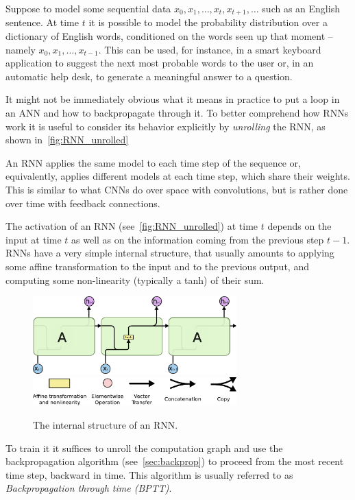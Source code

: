 Suppose to model some sequential data $x_0, x_1, \dots , x_t, x_{t+1}, \dots$
such as an English sentence. At time $t$ it is possible to model the
probability distribution over a dictionary of English words, conditioned on the
words seen up that moment -- namely $x_0, x_1, \dots , x_{t-1}$. This can be
used, for instance, in a smart keyboard application to suggest the next most
probable words to the user or, in an automatic help desk, to generate a
meaningful answer to a question.

It might not be immediately obvious what it means in practice to put a loop in
an ANN and how to backpropagate through it. To better comprehend how RNNs work
it is useful to consider its behavior explicitly by \emph{unrolling} the RNN,
as shown in~\autoref{fig:RNN_unrolled}

\noindent An RNN applies the same model to each time step of the sequence or,
equivalently, applies different models at each time step, which share their
weights. This is similar to what CNNs do over space with convolutions, but is
rather done over time with feedback connections.

The activation of an RNN (see~\autoref{fig:RNN_unrolled}) at time $t$ depends
on the input at time $t$ as well as on the information coming from the previous
step $t-1$. RNNs have a very simple internal structure, that usually amounts to
applying some affine transformation to the input and to the previous output,
and computing some non-linearity (typically a tanh) of their sum.

\begin{figure}[t]
    \centering
    \includegraphics[width=0.7\textwidth]{pdf/RNN_internals.pdf}
    \includegraphics[width=0.7\textwidth]{pdf/LSTM_notation.pdf}
    \caption{The internal structure of an RNN.\label{fig:RNN_internals}}
\end{figure}

To train it it suffices to unroll the computation graph and use the
backpropagation algorithm (see~\autoref{sec:backprop}) to proceed from the most
recent time step, backward in time. This algorithm is usually referred to as
\emph{Backpropagation through time (BPTT)}.

